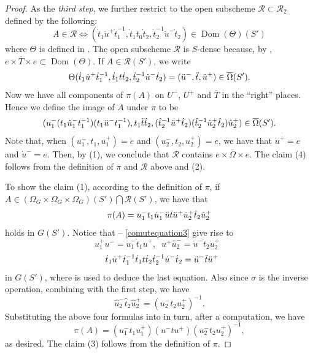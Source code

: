 \documentclass[10pt,a4paper]{amsart}
\DeclareMathOperator{\Dom}{Dom} %
\begin{document}
\begin{proof}
   As the \emph{third step}, we further restrict to the open subscheme $\mathcal{R}\subset\mathcal{R}_2$ defined by the following:
    $$A\in \mathcal{R}\iff(\dot{t}_1\dot{u}^+\dot{t}_1^{-1},\dot{t}_1 t_0\dot{t}_2, \dot{t}_2^{-1}\dot{u}^-\dot{t}_2)\in \Dom(\Theta)(S')$$
    where $\Theta$ is defined in . The open subscheme $\mathcal{R}$ is $S$-dense because, by , $e\times \overline{T}\times e\subset \Dom(\Theta)$.
    If $A\in\mathcal{R}(S')$, we write 
    \begin{equation}\label{comutequation3}    \Theta(\dot{t}_1\dot{u}^+\dot{t}_1^{-1},\dot{t}_1 t\dot{t}_2,\dot{t}_2^{-1}\dot{u}^-\dot{t}_2)=(\Ddot{u}^-, \Ddot{t}, \Ddot{u}^+)\in\overline{\Omega}(S').
    \end{equation}
    Now we have all components of $\pi(A)$ on $U^-$, $U^+$ and $\overline{T}$ in the ``right'' places. Hence 
    we define the image of $A$ under $\pi$ to be 
    \begin{equation}\label{definitionofpi}
        (u_1^- (t_1\Dot{u}_1^- t_1^{-1})(t_1\Ddot{u}^-t_1^{-1}),t_1\Ddot{t} \hat{t}_2,(\hat{t}_2^{-1}\Ddot{u}^+\hat{t}_2)(\hat{t}_2^{-1}\dot{u}_2^+\hat{t}_2)\hat{u}_2^+)\in \overline{\Omega}(S').
    \end{equation}
     Note that, when $(u^-_1, t_1,u^+_1)=e$ and $(u^-_2, t_2,u^+_2)=e$, we have that $\dot{u}^+=e$ and $\dot{u}^-=e$. Then, by  (1), we conclude that $\mathcal{R}$ contains $e\times \overline{\Omega}\times e$. The claim (4) follows from the definition of $\pi$ and $\mathcal{R}$ above and  (2).

    To show the claim (1), according to the definition of $\pi$, if $A\in(\Omega_G\times\Omega_G\times\Omega_G)(S')\bigcap\mathcal{R}(S')$, we have that
    \begin{equation}\label{comutequation4}
        \pi(A)=u_1^-t_1\dot{u}_1^-\Ddot{u}\Ddot{t}\Ddot{u}^+\dot{u}_2^+\hat{t}_2\hat{u}_2^+
    \end{equation}
    holds in $G(S')$.
    Notice that  -- \eqref{comutequation3} give rise to 
    $$u_1^+u^-=\dot{u}_1^-\dot{t}_1\dot{u}^+,\;\;u^+\hat{u}_2^-=\dot{u}^-\dot{t}_2 \dot{u}_2^+\;\;$$
    $$\;\;\dot{t}_1\dot{u}^+\dot{t}_1^{-1}\dot{t}_1t\dot{t}_2\dot{t}_2^{-1}\dot{u}^-\dot{t}_2=\Ddot{u}^- \Ddot{t}\Ddot{u}^+$$
    in $G(S')$,
    where  is used to deduce the last equation. 
    Also since $\sigma$ is the inverse operation, combining with the first step, we have 
    $$\hat{u}_2^-\hat{t}_2\hat{u}_2^+=(u_2^-t_2u_2^+)^{-1}.$$
    Substituting the above four formulas into   in turn, after a computation, we have 
    $$\pi(A)=(u_1^-t_1 u_1^+)(u^-tu^+)(u_2^-t_2u_2^+)^{-1},$$
    as desired. The claim (3) follows from the definition of $\pi$.
\end{proof}
\end{document}
